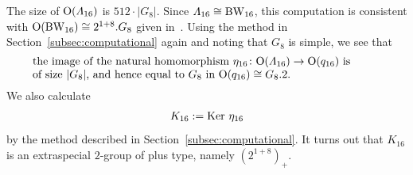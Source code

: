\documentclass{amsart} %
\begin{document}
%
%
%
 The size of $\mathord{\mathrm{O}}(\varLambda_{16})$ is $512\cdot |G_8|$.
 Since $\varLambda_{16}\cong \mathrm{BW}_{16}$, 
this computation is consistent with $\mathord{\mathrm{O}}(\mathrm{BW}_{16})\cong 2^{1+8}.G_8$
given in~\cite[Chapter 4, Section 10]{theCSbook}.
Using the method in Section~\ref{subsec:computational} again
and noting that $G_8$ is simple,
we see that 
%
\begin{equation}\label{eq:Imageeta16}
\parbox{11cm}{
\textrm{%
the image of 
the natural homomorphism $\eta_{16}\colon \OG(\Lamsxtn)\to \OG(q_{16})$  is \\
 of size $|G_8|$, and hence 
equal to $G_8$ in $\OG(q_{16})\cong G_8.2$.
}
}
\end{equation}
%
%
We also  calculate
\[
K_{16}:=\operatorname{Ker} \,\eta_{16}
\]
by the method described  in Section~\ref{subsec:computational}.
It turns out that 
$K_{16}$ is 
an extraspecial $2$-group of plus type, namely $(2^{1+8})_{+}$.
%
%
%
%
%
%
\end{document}
